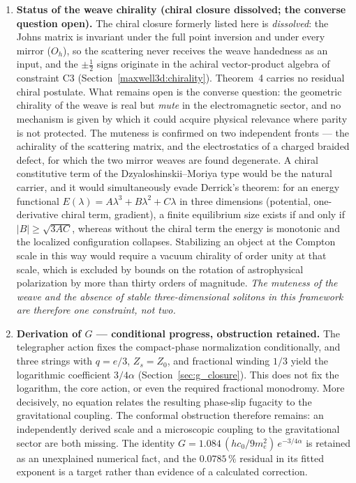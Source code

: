 \documentclass[11pt,a4paper]{article}
\theoremstyle{plain}
\theoremstyle{remark}
\begin{document}
\begin{enumerate}
    \item \textbf{Status of the weave chirality (chiral closure dissolved; the converse question open).} The chiral closure formerly listed here is \emph{dissolved}: the Johns matrix is invariant under the full point inversion and under every mirror ($O_h$), so the scattering never receives the weave handedness as an input, and the $\pm\tfrac12$ signs originate in the achiral vector-product algebra of constraint C3 (Section~\ref{maxwell3d:chirality}). Theorem~4 carries no residual chiral postulate. What remains open is the converse question: the geometric chirality of the weave is real but \emph{mute} in the electromagnetic sector, and no mechanism is given by which it could acquire physical relevance where parity is not protected. The muteness is confirmed on two independent fronts --- the achirality of the scattering matrix, and the electrostatics of a charged braided defect, for which the two mirror weaves are found degenerate. A chiral constitutive term of the Dzyaloshinskii--Moriya type would be the natural carrier, and it would simultaneously evade Derrick's theorem: for an energy functional $E(\lambda) = A\lambda^3 + B\lambda^2 + C\lambda$ in three dimensions (potential, one-derivative chiral term, gradient), a finite equilibrium size exists if and only if $|B| \geq \sqrt{3AC}$, whereas without the chiral term the energy is monotonic and the localized configuration collapses. Stabilizing an object at the Compton scale in this way would require a vacuum chirality of order unity at that scale, which is excluded by bounds on the rotation of astrophysical polarization by more than thirty orders of magnitude. \emph{The muteness of the weave and the absence of stable three-dimensional solitons in this framework are therefore one constraint, not two.}
    \item \textbf{Derivation of $G$ --- conditional progress, obstruction retained.} The telegrapher action fixes the compact-phase normalization conditionally, and three strings with $q=e/3$, $Z_s=Z_0$, and fractional winding $1/3$ yield the logarithmic coefficient $3/4\alpha$ (Section~\ref{sec:g_closure}). This does not fix the logarithm, the core action, or even the required fractional monodromy. More decisively, no equation relates the resulting phase-slip fugacity to the gravitational coupling. The conformal obstruction therefore remains: an independently derived scale and a microscopic coupling to the gravitational sector are both missing. The identity $G = 1.084\,(hc_0/9m_e^2)\,e^{-3/4\alpha}$ is retained as an unexplained numerical fact, and the $0.0785\,\%$ residual in its fitted exponent is a target rather than evidence of a calculated correction.

\end{enumerate}
\end{document}
